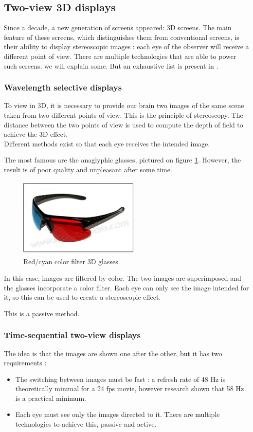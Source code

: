 \subsection{Two-view 3D displays}
Since a decade, a new generation of screens appeared: 3D screens. The main feature of these screens, which distinguishes them from conventional screens, is their ability to display stereoscopic images : each eye of the observer will receive a different point of view.
There are multiple technologies that are able to power such screens; we will explain some. But an exhaustive list is present in \cite{mehrabi2013making}.

\subsubsection{Wavelength selective displays}
To view in 3D, it is necessary to provide our brain two images of the same scene taken from two different points of view. This is the principle of stereoscopy. The distance between the two points of view is used to compute the depth of field to achieve the 3D effect.\\
Different methods exist so that each eye receives the intended image. 

The most famous are the anaglyphic glasses, pictured on figure \ref{fig:anaglass}. However, the result is of poor quality and unpleasant after some time.

\begin{figure}[h!]
\centering
\centering\includegraphics[width=6cm,height=40mm]{image/1.jpg}
\caption{Red/cyan color filter 3D glasses\cite{ViewingOn3D}}
\label{fig:anaglass}
\end{figure}

In this case, images are filtered by color. The two images are superimposed and the glasses incorporate a color filter. Each eye can only see the image intended for it, so this can be used to create a stereoscopic effect. 

This is a passive method.

\subsubsection{Time-sequential two-view displays}
The idea is that the images are shown one after the other, but it has two requirements : 
\begin{itemize}
\item The switching between images must be fast : a refresh rate of 48 Hz is theoretically minimal for a 24 fps movie, however research \cite{holliman2011three} shown that 58 Hz is a practical minimum.
\item Each eye must see only the images directed to it. There are multiple technologies to achieve this, passive and active.
\end{itemize}

